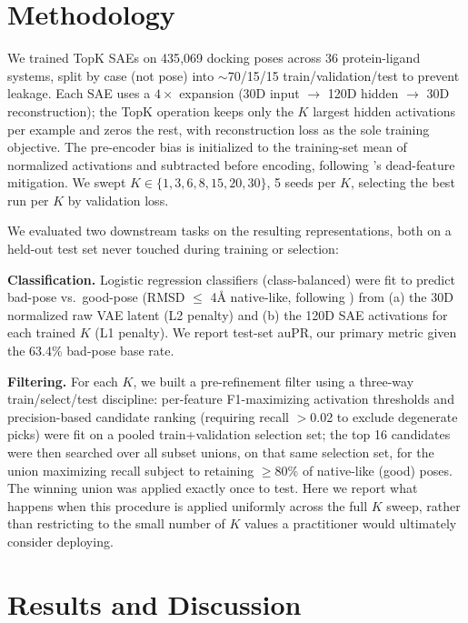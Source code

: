 \documentclass{article}
\begin{document}
\section{Methodology}

We trained TopK SAEs \citep{adams2025} on 435{,}069 docking poses across 36 protein-ligand systems, split by case (not pose) into $\sim$70/15/15 train/validation/test to prevent leakage. Each SAE uses a $4\times$ expansion (30D input $\to$ 120D hidden $\to$ 30D reconstruction); the TopK operation keeps only the $K$ largest hidden activations per example and zeros the rest, with reconstruction loss as the sole training objective. The pre-encoder bias is initialized to the training-set mean of normalized activations and subtracted before encoding, following \citet{simon2026}'s dead-feature mitigation. We swept $K\in\{1,3,6,8,15,20,30\}$, 5 seeds per $K$, selecting the best run per $K$ by validation loss.

We evaluated two downstream tasks on the resulting representations, both on a held-out test set never touched during training or selection:

\textbf{Classification.} Logistic regression classifiers (class-balanced) were fit to predict bad-pose vs.\ good-pose (RMSD $\le$ 4\r{A} native-like, following \citet{shim2022}) from (a) the 30D normalized raw VAE latent (L2 penalty) and (b) the 120D SAE activations for each trained $K$ (L1 penalty). We report test-set auPR, our primary metric given the 63.4\% bad-pose base rate.

\textbf{Filtering.} For each $K$, we built a pre-refinement filter using a three-way train/select/test discipline: per-feature F1-maximizing activation thresholds and precision-based candidate ranking (requiring recall $>$0.02 to exclude degenerate picks) were fit on a pooled train+validation selection set; the top 16 candidates were then searched over all subset unions, on that same selection set, for the union maximizing recall subject to retaining $\ge$80\% of native-like (good) poses. The winning union was applied exactly once to test. Here we report what happens when this procedure is applied uniformly across the full $K$ sweep, rather than restricting to the small number of $K$ values a practitioner would ultimately consider deploying.

\section{Results and Discussion}
\end{document}
